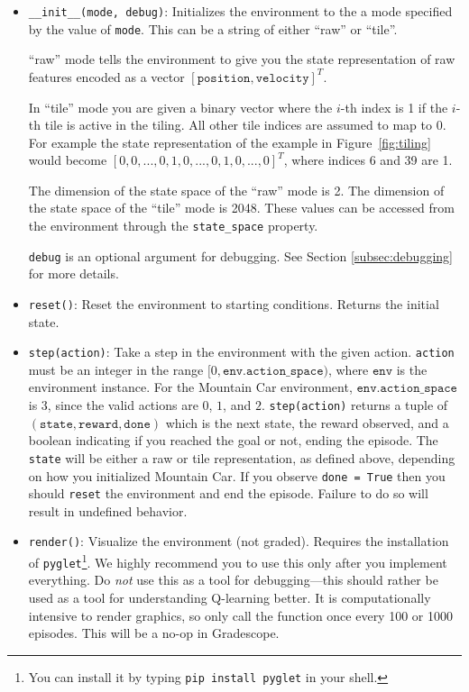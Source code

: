 \documentclass[11pt,addpoints,answers]{exam}
\begin{document}
\begin{itemize}
    \item \texttt{\_\_init\_\_(mode, debug)}: Initializes the environment to the a mode specified by the value of \texttt{mode}. This can be a string of either ``raw'' or ``tile''. 
    
    ``raw'' mode tells the environment to give you the state representation of raw features encoded as a vector $[\texttt{position}, \texttt{velocity}]^T$.
    
    In ``tile'' mode you are given a binary vector where the $i$-th index is 1 if the $i$-th tile is active in the tiling. All other tile indices are assumed to map to 0. For example the state representation of the example in Figure~\ref{fig:tiling} would become $[0, 0, ..., 0, 1, 0, ..., 0, 1, 0, ..., 0]^T$, where indices 6 and 39 are 1.
    
    The dimension of the state space of the ``raw'' mode is 2. The dimension of the state space of the ``tile'' mode is 2048. These values can be accessed from the environment through the \texttt{state\_space} property.
    
    \texttt{debug} is an optional argument for debugging. See Section \ref{subsec:debugging} for more details.
    
    \item \texttt{reset()}: Reset the environment to starting conditions. Returns the initial state.
        \item \texttt{step(action)}: Take a step in the environment with the given action. \texttt{action} must be an integer in the range $[0, \texttt{env.action\_space})$, where $\texttt{env}$ is the environment instance. For the Mountain Car environment, $\texttt{env.action\_space}$ is 3, since the valid actions are $0$, $1$, and $2$. \texttt{step(action)} returns a tuple of $(\texttt{state}, \texttt{reward}, \texttt{done})$ which is the next state, the reward observed, and a boolean indicating if you reached the goal or not, ending the episode. The \texttt{state} will be either a raw or tile representation, as defined above, depending on how you initialized Mountain Car.  If you observe \texttt{done = True} then you should \texttt{reset} the environment and end the episode. Failure to do so will result in undefined behavior.
    \item \texttt{render()}: Visualize the environment (not graded). Requires the installation of \texttt{pyglet}\footnote{You can install it by typing \texttt{pip install pyglet} in your shell.}. We highly recommend you to use this only after you implement everything. Do \emph{not} use this as a tool for debugging---this should rather be used as a tool for understanding Q-learning better. It is computationally intensive to render graphics, so only call the function once every 100 or 1000 episodes. This will be a no-op in Gradescope.
\end{itemize}
\end{document}
